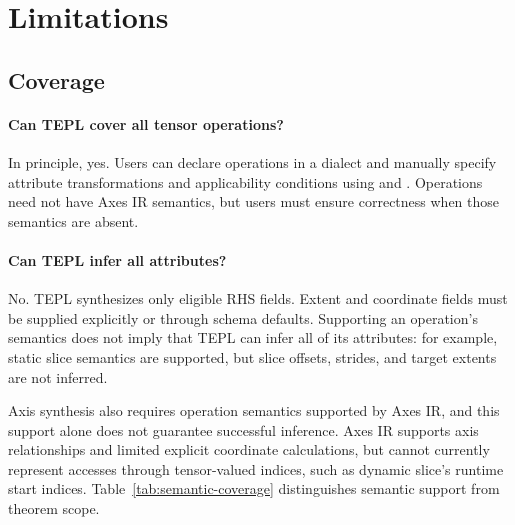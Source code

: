 \section{Limitations}
\label{sec:limitations}
\label{sec:guarantee}
\subsection{Coverage}
\label{sec:coverage}

\paragraph{Can TEPL cover all tensor operations?}
In principle, yes. Users can declare operations in a dialect and manually
specify attribute transformations and applicability conditions using
 and .
Operations need not have Axes IR semantics, but users must ensure
correctness when those semantics are absent.

\paragraph{Can TEPL infer all attributes?}
No. TEPL synthesizes only eligible RHS  fields.
Extent and coordinate fields must be supplied explicitly or through
schema defaults. Supporting an operation's semantics does not imply
that TEPL can infer all of its attributes: for example, static slice
semantics are supported, but slice offsets, strides, and target
extents are not inferred.

Axis synthesis also requires operation semantics supported by Axes IR,
and this support alone does not guarantee successful inference.
Axes IR supports axis relationships and limited explicit coordinate
calculations, but cannot currently represent accesses through
tensor-valued indices, such as dynamic slice's runtime start indices.
Table~\ref{tab:semantic-coverage} distinguishes semantic support
from theorem scope.

